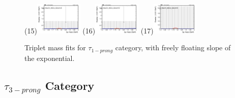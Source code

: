 \begin{figure}[h!]
        \subfigure(15){\includegraphics[width=0.2\textwidth]{unfixed_exp/plots/tauhA/massfit_tauhA_40bins_bdtcut0.46.png}}
        \subfigure(16){\includegraphics[width=0.2\textwidth]{unfixed_exp/plots/tauhA/massfit_tauhA_40bins_bdtcut0.52.png}}
        \subfigure(17){\includegraphics[width=0.2\textwidth]{unfixed_exp/plots/tauhA/massfit_tauhA_40bins_bdtcut0.58.png}}
        \caption{Triplet mass fits for $\tau_{1-prong}$ category, with freely floating slope of the exponential.}
        \label{fig:unfixed_tauha}
\end{figure}

\newpage

\subsection{$\tau_{3-prong}$ Category}
\label{sec:tauhb}


